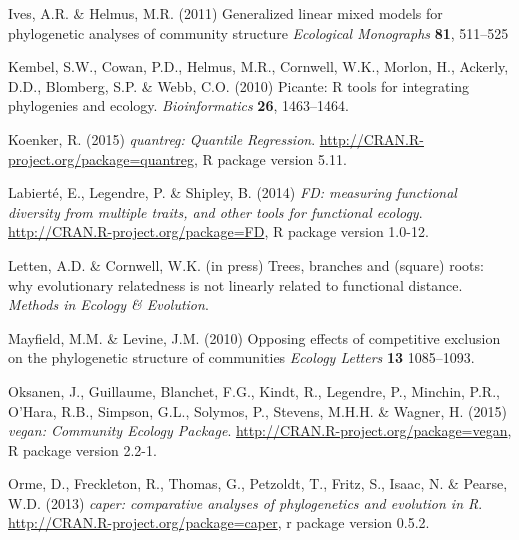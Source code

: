 \documentclass{bioinfo}
\begin{document}
\begin{thebibliography}{30}
Ives, A.R. \&
  Helmus, M.R. (2011) Generalized linear mixed models for phylogenetic
  analyses of community structure \emph{Ecological Monographs}
  \textbf{81}, 511--525

Kembel, S.W., Cowan, P.D., Helmus, M.R., Cornwell, W.K., Morlon, H., Ackerly,
  D.D., Blomberg, S.P. \& Webb, C.O. (2010) Picante: R tools for integrating
  phylogenies and ecology. \emph{Bioinformatics} \textbf{26}, 1463--1464.

 Koenker, R. (2015)
  \emph{quantreg: Quantile
    Regression}. \urlprefix\url{http://CRAN.R-project.org/package=quantreg},
  R package version 5.11.

 Labiert\'{e}, E., Legendre,
  P. \& Shipley, B. (2014) \emph{FD: measuring functional diversity
    from multiple traits, and other tools for functional
    ecology}. \urlprefix\url{http://CRAN.R-project.org/package=FD}, R
  package version 1.0-12.

 Letten, A.D. \&
  Cornwell, W.K. (in press) Trees, branches and (square) roots: why
  evolutionary relatedness is not linearly related to functional
  distance. \emph{Methods in Ecology \& Evolution}.

  Mayfield, M.M. \& Levine, J.M. (2010) Opposing effects of
  competitive exclusion on the phylogenetic structure of communities
  \emph{Ecology Letters} \textbf{13} 1085--1093.

 Oksanen, J., Guillaume, Blanchet, F.G., Kindt,
R., Legendre, P., Minchin, P.R., O'Hara, R.B., Simpson, G.L., Solymos,
P., Stevens, M.H.H. \& Wagner, H. (2015) \emph{vegan: Community Ecology
  Package}. \urlprefix\url{http://CRAN.R-project.org/package=vegan}, R
package version 2.2-1.

Orme, D., Freckleton, R., Thomas, G., Petzoldt, T., Fritz, S., Isaac, N. \&
  Pearse, W.D. (2013) \emph{caper: comparative analyses of phylogenetics and
  evolution in {R}}. \urlprefix\url{http://CRAN.R-project.org/package=caper}, r
  package version 0.5.2.


\end{thebibliography}
\end{document}
